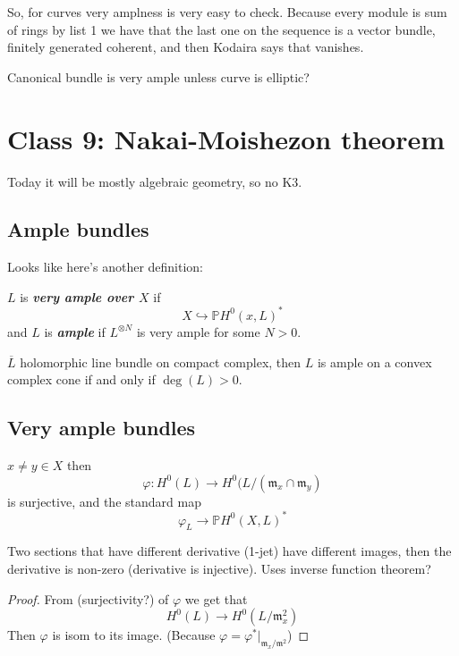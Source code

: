 \begin{remark}
	So, for curves very amplness is very easy to check. Because every module is sum of rings by list 1 we have that the last one on the sequence is a vector bundle, finitely generated coherent, and then Kodaira says that vanishes.
\end{remark}

Canonical bundle is very ample unless curve is elliptic?

\section{Class 9: Nakai-Moishezon theorem}
Today it will be mostly algebraic geometry, so no K3.

\subsection{Ample bundles}
Looks like here's another definition:

\begin{defn}\leavevmode
	$L$ is \textit{\textbf{very ample over $X$}}  if
	\[X\hookrightarrow \mathbb{P}H^{0}(x,L)^*\]
	and $L$ is  \textit{\textbf{ample}} if $L^{\otimes N}$ is very ample for some $N>0$.
\end{defn}

\begin{remark}
	$\overline{L}$ holomorphic line bundle on compact complex, then $L$ is ample on a convex complex cone if and only if $\operatorname{deg}(L)>0$.
\end{remark}

\subsection{Very ample bundles}


\begin{claim}
	$x\neq y\in X$ then
	\[\varphi:H^{0}(L)\longrightarrow H^{0}(L/(\mathfrak{m}_x\cap \mathfrak{m}_y)\]
	is surjective, and the standard map
	\[\varphi_L\longrightarrow \mathbb{P}H^{0}(X,L)^*\]
\end{claim}

Two sections that have different derivative (1-jet) have different images, then the derivative is non-zero (derivative is injective). Uses inverse function theorem?

\begin{proof}\leavevmode
From (surjectivity?) of $\varphi$ we get that
	\[H^{0}(L)\longrightarrow H^{0}(L/\mathfrak{m}_x^2)\]
	Then $\varphi$ is isom to its image. (Because $\varphi=\varphi^*\Big|_{\mathfrak{m}_x/\mathfrak{m}^2}$)
\end{proof}

